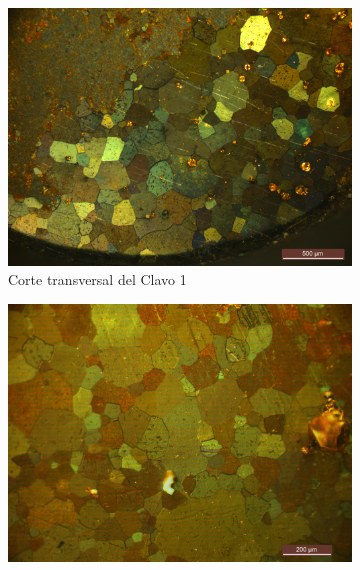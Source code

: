 \documentclass[a4paper,12pt,fleqn,twoside,openany]{book}
\begin{document}
  \begin{figure}%
    \centering
    
    ~ %
    \begin{subfigure}{0.45\textwidth}
        \includegraphics[width=\textwidth]{Img/Resultados/clavos/tg/Clavo1.jpg}
        \caption{Corte transversal del Clavo 1}%
        \label{fig: MClavo1}
    \end{subfigure}
        \begin{subfigure}{0.45\textwidth}
        \includegraphics[width=\textwidth]{Img/Resultados/clavos/tg/Clavo2.jpg}

\end{subfigure}
\end{figure}
\end{document}
